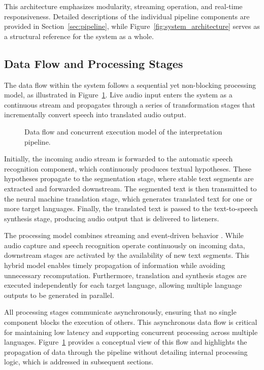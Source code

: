 This architecture emphasizes modularity, streaming operation, and real-time responsiveness. Detailed descriptions of the individual pipeline components are provided in Section~\ref{sec:pipeline}, while Figure~\ref{fig:system_architecture} serves as a structural reference for the system as a whole.


\subsection{Data Flow and Processing Stages}

The data flow within the system follows a sequential yet non-blocking processing model, as illustrated in Figure~\ref{fig:data_flow}. Live audio input enters the system as a continuous stream and propagates through a series of transformation stages that incrementally convert speech into translated audio output.

\begin{figure}[!htbp]
  \centering
  
  \caption[Interpretation pipeline Data flow ]{Data flow and concurrent execution model of the interpretation pipeline.}
  \label{fig:data_flow}
\end{figure}

Initially, the incoming audio stream is forwarded to the automatic speech recognition component, which continuously produces textual hypotheses. These hypotheses propagate to the segmentation stage, where stable text segments are extracted and forwarded downstream. The segmented text is then transmitted to the neural machine translation stage, which generates translated text for one or more target languages. Finally, the translated text is passed to the text-to-speech synthesis stage, producing audio output that is delivered to listeners.

The processing model combines streaming and event-driven behavior \cite{Sethiya2023EndtoEndSurvey}. While audio capture and speech recognition operate continuously on incoming data, downstream stages are activated by the availability of new text segments. This hybrid model enables timely propagation of information while avoiding unnecessary recomputation. Furthermore, translation and synthesis stages are executed independently for each target language, allowing multiple language outputs to be generated in parallel.

All processing stages communicate asynchronously, ensuring that no single component blocks the execution of others. This asynchronous data flow is critical for maintaining low latency and supporting concurrent processing across multiple languages. Figure~\ref{fig:data_flow} provides a conceptual view of this flow and highlights the propagation of data through the pipeline without detailing internal processing logic, which is addressed in subsequent sections.



